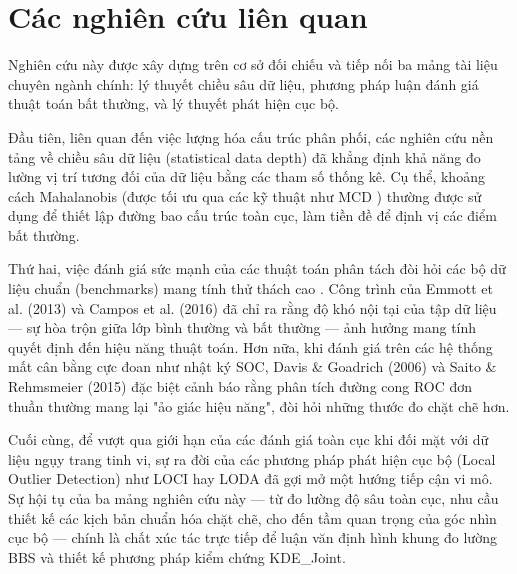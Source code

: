 \documentclass[../main.tex]{subfiles}
\begin{document}
\section{Các nghiên cứu liên quan}
\label{section:1.8}

Nghiên cứu này được xây dựng trên cơ sở đối chiếu và tiếp nối ba mảng tài liệu chuyên ngành chính: lý thuyết chiều sâu dữ liệu, phương pháp luận đánh giá thuật toán bất thường, và lý thuyết phát hiện cục bộ.

Đầu tiên, liên quan đến việc lượng hóa cấu trúc phân phối, các nghiên cứu nền tảng về chiều sâu dữ liệu (statistical data depth) \cite{liu1993quality, zuo2000general} đã khẳng định khả năng đo lường vị trí tương đối của dữ liệu bằng các tham số thống kê. Cụ thể, khoảng cách Mahalanobis (được tối ưu qua các kỹ thuật như MCD \cite{rousseeuw1999fast}) thường được sử dụng để thiết lập đường bao cấu trúc toàn cục, làm tiền đề để định vị các điểm bất thường.

Thứ hai, việc đánh giá sức mạnh của các thuật toán phân tách đòi hỏi các bộ dữ liệu chuẩn (benchmarks) mang tính thử thách cao \cite{janssens2012data, zimek2012survey}. Công trình của Emmott et al. (2013) \cite{emmott2013systematic} và Campos et al. (2016) \cite{campos2016evaluation} đã chỉ ra rằng độ khó nội tại của tập dữ liệu — sự hòa trộn giữa lớp bình thường và bất thường — ảnh hưởng mang tính quyết định đến hiệu năng thuật toán. Hơn nữa, khi đánh giá trên các hệ thống mất cân bằng cực đoan như nhật ký SOC, Davis \& Goadrich (2006) \cite{davis2006relationship} và Saito \& Rehmsmeier (2015) \cite{saito2015precision} đặc biệt cảnh báo rằng phân tích đường cong ROC đơn thuần thường mang lại "ảo giác hiệu năng", đòi hỏi những thước đo chặt chẽ hơn.

Cuối cùng, để vượt qua giới hạn của các đánh giá toàn cục khi đối mặt với dữ liệu ngụy trang tinh vi, sự ra đời của các phương pháp phát hiện cục bộ (Local Outlier Detection) như LOCI \cite{papadimitriou2003loci} hay LODA \cite{pevny2016loda} đã gợi mở một hướng tiếp cận vi mô. Sự hội tụ của ba mảng nghiên cứu này — từ đo lường độ sâu toàn cục, nhu cầu thiết kế các kịch bản chuẩn hóa chặt chẽ, cho đến tầm quan trọng của góc nhìn cục bộ — chính là chất xúc tác trực tiếp để luận văn định hình khung đo lường BBS và thiết kế phương pháp kiểm chứng KDE\_Joint. 
\end{document}

